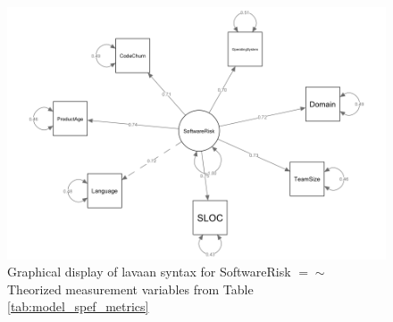 \begin{figure}
	\centering
		\includegraphics[width=1\textwidth]{syntax_swrisk_asmeasuredby.png}
		\caption{Graphical display of lavaan syntax for SoftwareRisk $=\sim$ Theorized measurement variables from Table  \ref{tab:model_spef_metrics}}
		\label{fig:model_example_syntax_asmeasuredby}	
\end{figure}

